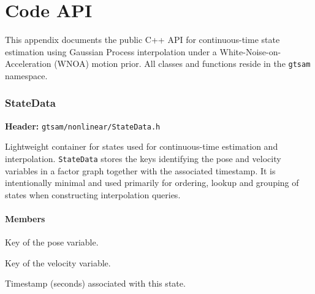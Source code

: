 \documentclass[11pt]{report}
\begin{document}
\chapter*{Code API}

\begingroup
\setlength{\emergencystretch}{3em}


This appendix documents the public C++ API for continuous-time state estimation
using Gaussian Process interpolation under a White-Noise-on-Acceleration (WNOA)
motion prior. All classes and functions reside in the \texttt{gtsam} namespace.

\newpage
\footnotesize
\subsection*{StateData}
\label{sec:api-statedata}

\textbf{Header:} \texttt{gtsam/nonlinear/StateData.h}

\medskip\noindent
Lightweight container for states used for continuous-time estimation and
interpolation. \texttt{StateData} stores the keys identifying the pose and
velocity variables in a factor graph together with the associated timestamp.
It is intentionally minimal and used primarily for ordering, lookup and
grouping of states when constructing interpolation queries.

\subsubsection*{Members}
\begin{description}[style=nextline,leftmargin=2em]
	\item[\texttt{Key pose}] Key of the pose variable.
	\item[\texttt{Key vel}] Key of the velocity variable.
	\item[\texttt{double time}] Timestamp (seconds) associated with this state.
\end{description}
\end{document}
